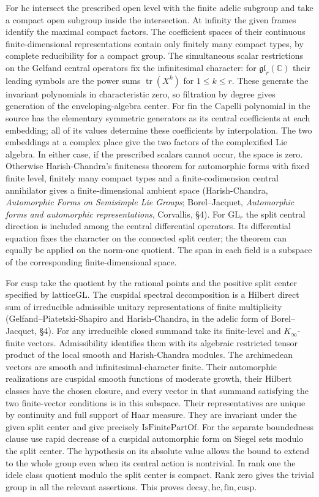 For $\mathrm{hc}$ intersect the prescribed open level with the
finite adelic subgroup and take a compact open subgroup inside the
intersection. At infinity the given frames identify the maximal
compact factors. The coefficient spaces of their continuous
finite-dimensional representations contain only finitely many
compact types, by complete reducibility for a compact group.
The simultaneous scalar restrictions on the Gelfand central
operators fix the infinitesimal character: for
$\mathfrak{gl}_r(\mathbb C)$ their leading symbols are the
power sums $\operatorname{tr}(X^k)$ for $1\leq k\leq r$.
These generate the invariant polynomials in characteristic zero,
so filtration by degree gives generation of the enveloping-algebra
center. For $\mathrm{fin}$ the Capelli polynomial in the source
has the elementary symmetric generators as its central coefficients
at each embedding; all of its values determine these coefficients
by interpolation. The two embeddings at a complex place give the
two factors of the complexified Lie algebra. In either case, if the
prescribed scalars cannot occur, the space is zero. Otherwise
Harish-Chandra's finiteness theorem for automorphic forms with
fixed finite level, finitely many compact types and a finite-codimension
central annihilator gives a finite-dimensional ambient space
(Harish-Chandra, \emph{Automorphic Forms on Semisimple Lie Groups};
Borel--Jacquet, \emph{Automorphic forms and automorphic
representations}, Corvallis, \S4). For $\mathrm{GL}_r$ the
split central direction is included among the central differential
operators. Its differential equation fixes the character on the
connected split center; the theorem can equally be applied on the
norm-one quotient. The span in each field is a subspace of the
corresponding finite-dimensional space.

For $\mathrm{cusp}$ take the quotient by the rational points and
the positive split center specified by $\mathrm{latticeGL}$.
The cuspidal spectral decomposition is a Hilbert direct sum of
irreducible admissible unitary representations of finite multiplicity
(Gelfand--Piatetski-Shapiro and Harish-Chandra, in the adelic
form of Borel--Jacquet, \S4). For any irreducible closed summand
take its finite-level and $K_\infty$-finite vectors. Admissibility
identifies them with its algebraic restricted tensor product of
the local smooth and Harish-Chandra modules. The archimedean
vectors are smooth and infinitesimal-character finite. Their
automorphic realizations are cuspidal smooth functions of moderate
growth, their Hilbert classes have the chosen closure, and every
vector in that summand satisfying the two finite-vector conditions
is in this subspace. Their representatives are unique by continuity
and full support of Haar measure. They are invariant under the
given split center and give precisely $\mathrm{IsFinitePartOf}$.
For the separate boundedness clause use rapid decrease of a
cuspidal automorphic form on Siegel sets modulo the split center.
The hypothesis on its absolute value allows the bound to extend
to the whole group even when its central action is nontrivial.
In rank one the idele class quotient modulo the split center is
compact. Rank zero gives the trivial group in all the relevant
assertions. This proves $\mathrm{decay,hc,fin,cusp}$.

